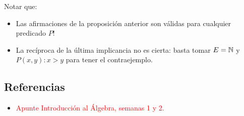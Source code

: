 \begin{nota}
	Notar que: 
	\begin{itemize}
		\item Las afirmaciones de la proposición anterior son válidas para cualquier predicado $P$! 
		\item La recíproca de la última implicancia no es cierta: basta tomar $E = \mathbb{N}$ y $P(x,y): x > y$ para tener el contraejemplo. 
	\end{itemize}
\end{nota}

\subsection{Referencias}

\begin{itemize}	
	\item \textcolor{red}{Apunte Introducción al Álgebra, semanas 1 y 2. }
\end{itemize}
